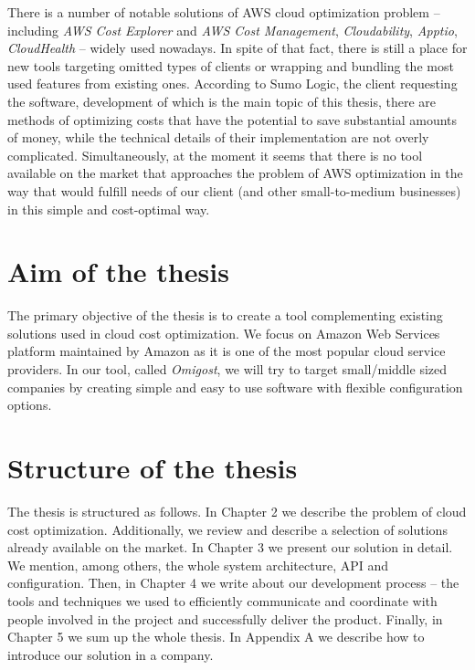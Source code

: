 \documentclass[licencjacka,en]{thesisclass}
\begin{document}
    There is a number of notable solutions of AWS cloud optimization
    problem -- including \textit{AWS Cost Explorer} and \textit{AWS Cost Management},
    \textit{Cloudability}, \textit{Apptio}, \textit{CloudHealth} -- widely used nowadays.
    In spite of that fact, there is still a place for new tools targeting
    omitted types of clients or wrapping and bundling the most used features from existing ones.
    According to Sumo Logic, the client requesting the software,
    development of which is the main topic of this thesis, there are methods of optimizing costs
    that have the potential to save substantial amounts of money, while the technical details
    of their implementation are not overly complicated.
    Simultaneously, at the moment it seems that there is
    no tool available on the market that approaches the problem
    of AWS optimization in the way that would fulfill
    needs of our client (and other small-to-medium businesses)
    in this simple and cost-optimal way.

    \section{Aim of the thesis}

    The primary objective of the thesis is to create a tool
    complementing existing solutions used in cloud cost optimization.
    We focus on Amazon Web Services platform maintained by Amazon
    as it is one of the most popular cloud service providers.
    In our tool, called \textit{Omigost}, we will try to target small/middle
    sized companies by creating simple and easy to use software
    with flexible configuration options.

    \section{Structure of the thesis}

    The thesis is structured as follows.
    In Chapter 2 we describe the problem of cloud cost optimization.
    Additionally, we review and describe a selection of solutions already available
    on the market.
    In Chapter 3 we present our solution in detail.
    We mention, among others, the whole system architecture, API and configuration.
    Then, in Chapter 4 we write about our development process -- the tools and techniques
    we used to efficiently communicate and coordinate with people involved in the project
    and successfully deliver the product.
    Finally, in Chapter 5 we sum up the whole thesis.
    In Appendix A we describe how to introduce our solution in a company.
\end{document}
